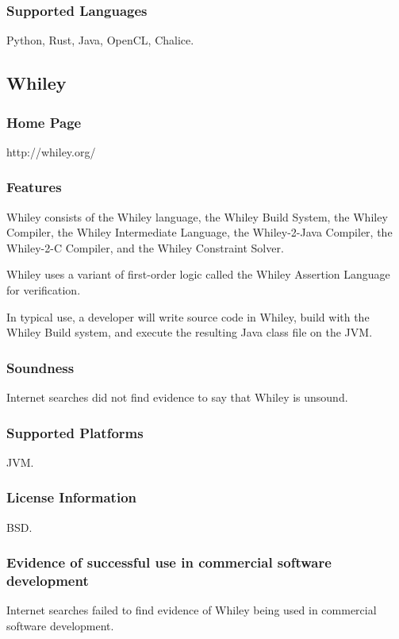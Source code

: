 \documentclass[11pt]{article}
\begin{document}
	\subsubsection{Supported Languages}
	Python, Rust, Java, OpenCL, Chalice.





\subsection{Whiley}
	\subsubsection{Home Page}
	http://whiley.org/
	
	\subsubsection{Features}
	Whiley consists of the Whiley language, the Whiley Build System, the Whiley Compiler, the Whiley Intermediate Language, the Whiley-2-Java Compiler, the Whiley-2-C Compiler, and the Whiley Constraint Solver\cite{10.1007/978-3-319-02654-1_13}. 
	
	Whiley uses a variant of first-order logic called the Whiley Assertion Language for verification.
	
	In typical use, a developer will write source code in Whiley, build with the Whiley Build system, and execute the resulting Java class file on the JVM.  

	\subsubsection{Soundness}
	Internet searches did not find evidence to say that Whiley is unsound.
	\subsubsection{Supported Platforms}
	JVM.
	\subsubsection{License Information}
	BSD.
	\subsubsection{Evidence of successful use in commercial software development}
		Internet searches failed to find evidence of Whiley being used in commercial software development.
\end{document}
